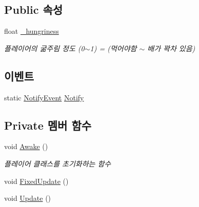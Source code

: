 \subsection*{Public 속성}
\begin{DoxyCompactItemize}
\item 
float \mbox{\hyperlink{class_player_controller_ab4fed78a016e8baca12e50bb3d7f034a}{\+\_\+hungriness}}
\begin{DoxyCompactList}\small\item\em 플레이어의 굶주림 정도 (0$\sim$1) = (먹어야함 $\sim$ 배가 꽉차 있음) \end{DoxyCompactList}\end{DoxyCompactItemize}
\subsection*{이벤트}
\begin{DoxyCompactItemize}
\item 
static \mbox{\hyperlink{class_player_controller_a934c7f80b80276620cd60eaaeea7520e}{Notify\+Event}} \mbox{\hyperlink{class_player_controller_af13292e01756741118500035511fc88d}{Notify}}
\end{DoxyCompactItemize}
\subsection*{Private 멤버 함수}
\begin{DoxyCompactItemize}
\item 
void \mbox{\hyperlink{class_player_controller_a050967f0e5c2340cb21861e4c8c788a1}{Awake}} ()
\begin{DoxyCompactList}\small\item\em 플레이어 클래스를 초기화하는 함수 \end{DoxyCompactList}\item 
void \mbox{\hyperlink{class_player_controller_ae5bdb1b48571f67c3f722a58b6f404d4}{Fixed\+Update}} ()
\item 
void \mbox{\hyperlink{class_player_controller_ae8bc83dffb99867a04be016473ed2c43}{Update}} ()
\end{DoxyCompactItemize}
